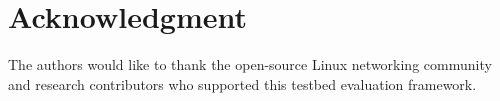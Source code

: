 \documentclass[conference]{IEEEtran}
\begin{document}
\section*{Acknowledgment}
The authors would like to thank the open-source Linux networking community and research contributors who supported this testbed evaluation framework.



\end{document}
